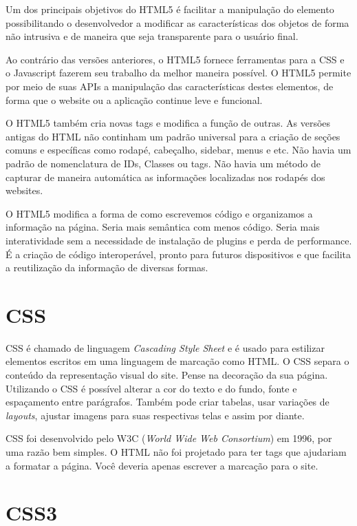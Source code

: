 Um dos principais objetivos do HTML5 é facilitar a manipulação do elemento possibilitando o desenvolvedor a modificar as características dos objetos de forma não intrusiva e de maneira que seja transparente para o usuário final.

Ao contrário das versões anteriores, o HTML5 fornece ferramentas para a CSS e o Javascript fazerem seu trabalho da melhor maneira possível. O HTML5 permite por meio de suas APIs a manipulação das características destes elementos, de forma que o website ou a aplicação continue leve
e funcional.

O HTML5 também cria novas tags e modifica a função de outras. As versões antigas do HTML não continham um padrão universal para a criação de seções comuns e específicas como rodapé, cabeçalho, sidebar, menus e etc. Não havia um padrão de nomenclatura de IDs, Classes ou tags. Não havia um método de capturar de maneira automática as informações localizadas nos rodapés
dos websites.

O HTML5 modifica a forma de como escrevemos código e organizamos a informação na página. Seria mais semântica com menos código. Seria mais interatividade sem a necessidade de instalação de plugins e perda de performance. É a criação de código interoperável, pronto para futuros dispositivos e que facilita a reutilização da informação de diversas formas.

\section{CSS}

CSS é chamado de linguagem \textit{Cascading Style Sheet} e é usado para estilizar elementos escritos em uma linguagem de marcação como HTML. O CSS separa o conteúdo da representação visual do site. Pense  na decoração da sua página. Utilizando o CSS é possível alterar a cor do texto e do fundo, fonte e espaçamento entre parágrafos. Também pode criar tabelas, usar variações de \textit{layouts}, ajustar imagens para suas respectivas telas e assim por diante.

CSS foi desenvolvido pelo W3C (\textit{World Wide Web Consortium}) em 1996, por uma razão bem simples. O HTML não foi projetado para ter tags que ajudariam a formatar a página. Você deveria apenas escrever a marcação para o site.

\section{CSS3}


